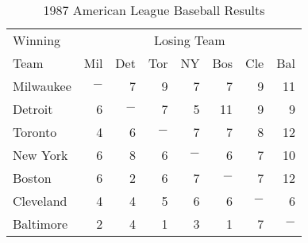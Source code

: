 \begin{table}[htb]
 \caption{1987 American League Baseball Results}\label{tab:winloss}
 \begin{center}
 \begin{tabular}{l| rrrrrrr}
 \hline
 Winning & \multicolumn{7}{c}{Losing Team} \\ \cline{2-8}
 Team    & Mil & Det & Tor & NY & Bos & Cle & Bal \\
 \hline
Milwaukee & $-$ &  7  &  9  &  7  &  7  &  9  & 11 \\ 
Detroit   &  6  & $-$ &  7  &  5  & 11  &  9  &  9 \\ 
Toronto   &  4  & 6   & $-$ &  7  &  7  &  8  & 12 \\ 
New York  &  6  & 8   &  6  & $-$ &  6  &  7  & 10 \\ 
Boston    &  6  & 2   &  6  &  7  & $-$ &  7  & 12 \\ 
Cleveland &  4  & 4   &  5  &  6  &  6  & $-$ &  6 \\ 
Baltimore &  2  & 4   &  1  &  3  &  1  &  7  & $-$ \\ 
 \hline
 \end{tabular}
 \end{center}
\end{table}
